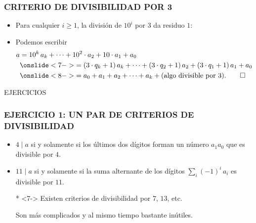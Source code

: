 \begin{frame}
  \frametitle{CRITERIO DE DIVISIBILIDAD POR 3}



  \begin{itemize}
  \item<4-> Para cualquier $i \ge 1$, la división de $10^i$ por $3$ da residuo $1$:

  \item<6-> Podemos escribir
    \begin{align*}
      a & = 10^k\,a_k + \cdots + 10^2\cdot a_2 + 10\cdot a_1 + a_0 \\
        & \onslide<7->{= (3\cdot q_k + 1)\,a_k + \cdots + (3\cdot q_2 + 1)\,a_2 + (3\cdot q_1 + 1)\,a_1 + a_0} \\
        & \onslide<8->{= a_0 + a_1 + a_2 + \cdots + a_k + (\text{algo divisible por }3). \qed}
    \end{align*}
  \end{itemize}
\end{frame}

\begin{frame}

  \vfill

  \begin{center}\huge\headingfont
    EJERCICIOS
  \end{center}

  \vfill
\end{frame}

\begin{frame}
  \frametitle{EJERCICIO 1: UN PAR DE CRITERIOS DE DIVISIBILIDAD}


  \begin{itemize}
  \item<3-> $4\mid a$ si y solamente si los últimos dos dígitos forman un número
    $a_1 a_0$ que es divisible por $4$.

  \item<5-> $11\mid a$ si y solamente si la suma alternante de los dígitos
    $\sum_i (-1)^i\,a_i$ es divisible por $11$.

  \item[*]<7-> Existen criterios de divisibilidad por $7$, $13$, etc.

    Son más complicados y al mismo tiempo bastante inútiles.
  \end{itemize}
\end{frame}

